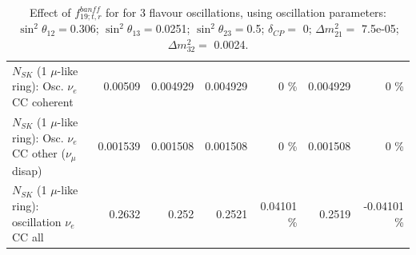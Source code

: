 \begin{table}
\begin{tabular}{| l | r | r | r  r | r  r |}
                          $N_{SK}$ (1 $\mu$-like ring): Osc. $\nu_e$ CC coherent &         0.00509 &        0.004929 &        0.004929 &        0 \%  &        0.004929 &        0 \%  \\ 
           $N_{SK}$ (1 $\mu$-like ring): Osc. $\nu_e$ CC other ($\nu_\mu$ disap) &        0.001539 &        0.001508 &        0.001508 &        0 \%  &        0.001508 &        0 \%  \\ 
                        $N_{SK}$ (1 $\mu$-like ring): oscillation $\nu_e$ CC all &          0.2632 &           0.252 &          0.2521 &  0.04101 \%  &          0.2519 & -0.04101 \%  \\ 
\hline
\hline
\end{tabular}
\caption{ Effect of $f_{19; t, r}^{banff}$ for for 3 flavour oscillations, using oscillation parameters:  $\sin^2\theta_{12} = $0.306; $\sin^2\theta_{13} = $0.0251; $\sin^2\theta_{23} = $0.5; $\delta_{CP} = $        0; $\Delta m^2_{21} = $    7.5e-05; $\Delta m^2_{32} = $    0.0024. }
\label{tab:num_banff_ccqeE1_1RmuT_3f_osc_t13:0.0251}
\end{table}
\clearpage
